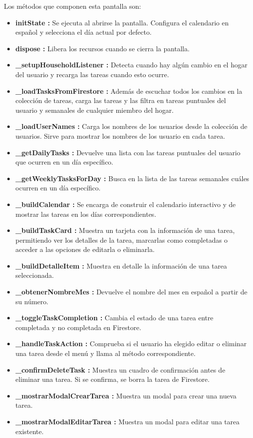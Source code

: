 Los métodos que componen esta pantalla son: 
\begin{itemize}
    \item \textbf{initState :} Se ejecuta al abrirse la pantalla. Configura el calendario en español y selecciona el día actual por defecto.
    \item \textbf{dispose :} Libera los recursos cuando se cierra la pantalla.
    \item \textbf{\_setupHouseholdListener :} Detecta cuando hay algún cambio en el hogar del usuario y recarga las tareas cuando esto ocurre.
    \item \textbf{\_loadTasksFromFirestore :} Además de escuchar todos los cambios en la colección de tareas, carga las tareas y las filtra en tareas puntuales del usuario y semanales de cualquier miembro del hogar. 
    \item \textbf{\_loadUserNames :} Carga los nombres de los usuarios desde la colección de usuarios. Sirve para mostrar los nombres de los usuario en cada tarea.
    \item \textbf{\_getDailyTasks :} Devuelve una lista con las tareas puntuales del usuario que ocurren en un día específico.
    \item \textbf{\_getWeeklyTasksForDay :} Busca en la lista de las tareas semanales cuáles ocurren en un día específico.
    \item \textbf{\_buildCalendar :} Se encarga de construir el calendario interactivo y de mostrar las tareas en los días correspondientes.
    \item \textbf{\_buildTaskCard :} Muestra un tarjeta con la información de una tarea, permitiendo ver los detalles de la tarea, marcarlas como completadas o acceder a las opciones de editarla o eliminarla.
    \item \textbf{\_buildDetalleItem :} Muestra en detalle la información de una tarea seleccionada.
    \item \textbf{\_obtenerNombreMes :} Devuelve el nombre del mes en español a partir de su número.
    \item \textbf{\_toggleTaskCompletion :} Cambia el estado de una tarea entre completada y no completada en Firestore. 
    \item \textbf{\_handleTaskAction :} Comprueba si el usuario ha elegido editar o eliminar una tarea desde el menú y llama al método correspondiente.
    \item \textbf{\_confirmDeleteTask :} Muestra un cuadro de confirmación antes de eliminar una tarea. Si se confirma, se borra la tarea de Firestore.
    \item \textbf{\_mostrarModalCrearTarea :} Muestra un modal para crear una nueva tarea.
    \item \textbf{\_mostrarModalEditarTarea :} Muestra un modal para editar una tarea existente.
\end{itemize}

